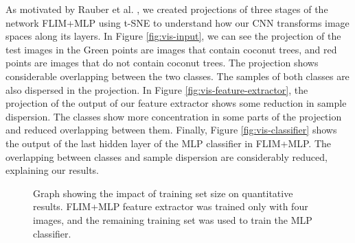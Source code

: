 As motivated by Rauber et al. \cite{rauber2016visualizing}, we created projections of three stages of the network FLIM+MLP using t-SNE \cite{maaten2008visualizing} to understand how our CNN transforms image spaces along its layers. In Figure \ref{fig:vis-input}, we can see the projection of the test images in the  Green points are images that contain coconut trees, and red points are images that do not contain coconut trees. The projection shows considerable overlapping between the two classes. The samples of both classes are also dispersed in the projection. In Figure \ref{fig:vis-feature-extractor}, the projection of the output of our feature extractor shows some reduction in sample dispersion. The classes show more concentration in some parts of the projection and reduced overlapping between them. Finally, Figure \ref{fig:vis-classifier} shows the output of the last hidden layer of the MLP classifier in FLIM+MLP. The overlapping between classes and sample dispersion are considerably reduced, explaining our results.


\begin{figure}
  \begin{center}
\end{center}
\caption{Graph showing the impact of training set size on quantitative results. FLIM+MLP feature extractor was trained only with four images, and the remaining training set was used to train the MLP classifier.}
\end{figure}



